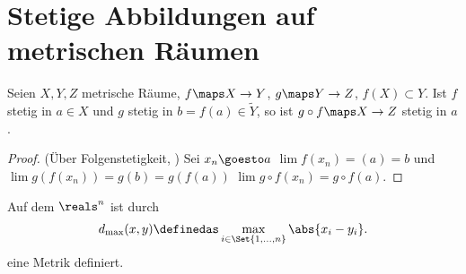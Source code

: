 \section{Stetige Abbildungen auf metrischen Räumen}
\begin{lemma}\label{metrische_raeume_komposition_stetig}
    Seien \( X,Y,Z\) metrische Räume, \( f\maps X\to Y\), \( g\maps Y\to Z\), \( f(X)\subset Y\). Ist \( f\) stetig in \( a\in X\) und \( g\) stetig in \( b=f(a)\in \tilde{Y} \), so ist \( g\circ f\maps X\to Z\) stetig in \( a\).
\end{lemma}
\begin{proof} (Über Folgenstetigkeit, )
    Sei \( x_n\goesto a\) \timplies \( \lim f(x_n)=(a)=b\) und \( \lim g(f(x_n))=g(b)=g(f(a))\) \timplies \( \lim g\circ f(x_n)=g\circ f(a)\).   
    
\end{proof}
\begin{definition}
    Auf dem \( \reals^n\) ist durch
    \begin{align*}
        d_{\max}(x,y)\definedas \max_{i\in \Set{1,\ldots,n}}\abs{x_i-y_i}. 
    \end{align*}
    eine Metrik definiert.
\end{definition}
